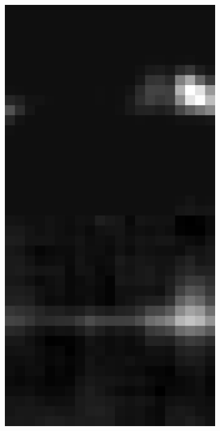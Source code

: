 \documentclass[10pt, letter]{article}
\begin{document}
\begin{figure}[h!]
				~
				\begin{subfigure}[t]{0.1\textwidth}
					\centering
					\includegraphics[width=\textwidth]{figures/inv2}
				\end{subfigure}	
				~
				\begin{subfigure}[t]{0.1\textwidth}

\end{subfigure}
\end{figure}
\end{document}
